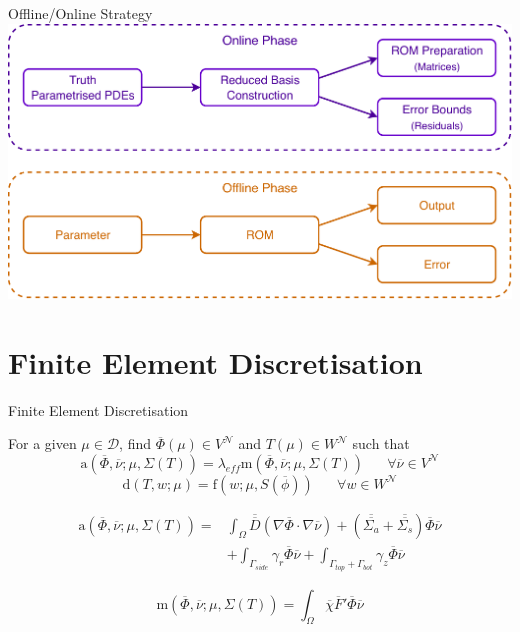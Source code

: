 \documentclass{beamer}
\renewcommand{\vec}[1]{\ensuremath{\overline{#1}}}
\newcommand{\mtx}[1]{\ensuremath{\overline{\overline{#1}}}}
\begin{document}
\begin{frame}{Offline/Online Strategy}
    \includegraphics[width=\textwidth]{OLOF.pdf}
\end{frame}

\section{Finite Element Discretisation}
\begin{frame}{Finite Element Discretisation}
    \begin{block}{}
        For a given $\mu \in \mathcal{D}$, find $\vec{\Phi}(\mu) \in V^{\mathcal{N}}$ and $T(\mu) \in W^{\mathcal{N}}$ such that
        \[
        \mathrm{a}\left (\vec{\Phi},\vec{\nu}; \mu, \Sigma(T)\right ) = \lambda_{eff} \mathrm{m} \left (\vec{\Phi},\vec{\nu}; \mu, \Sigma(T)\right ) \mspace{30mu} \forall \vec{\nu} \in V^{\mathcal{N}}
        \]
        \[
        \mathrm{d}\left(T,w;\mu\right) = \mathrm{f}\left(w;\mu , S(\vec{\phi})\right) \mspace{30mu} \forall w \in W^{\mathcal{N}}
        \]
    \end{block}
    \begin{exampleblock}{}
        \begin{equation*}
            \begin{aligned}
            \mathrm{a}\left (\vec{\Phi},\vec{\nu}; \mu, \Sigma(T)\right ) = &\int_{\Omega} \mtx{D}(\nabla \vec{\Phi}\cdot\nabla\vec{\nu}) + (\mtx{\Sigma_a} + \mtx{\Sigma_s})\vec{\Phi}\vec{\nu} \\
            &+ \int_{\Gamma_{side}} \gamma_r \vec{\Phi}\vec{\nu} + \int_{\Gamma_{top} + \Gamma_{bot}} \gamma_z \vec{\Phi}\vec{\nu}
            \end{aligned}
        \end{equation*}
    \end{exampleblock}
    \begin{exampleblock}{}
        \begin{equation*}
            \mathrm{m} \left (\vec{\Phi},\vec{\nu}; \mu, \Sigma(T)\right ) = \int_{\Omega} \vec{\chi}\vec{F}'\vec{\Phi}\vec{\nu}
        \end{equation*}
    \end{exampleblock}
\end{frame}
\end{document}
